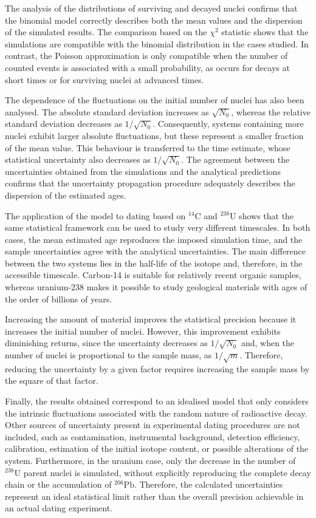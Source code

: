 \documentclass[12pt,a4paper]{article}
\begin{document}
The analysis of the distributions of surviving and decayed nuclei confirms that the binomial model correctly describes both the mean values and the dispersion of the simulated results. The comparison based on the $\chi^2$ statistic shows that the simulations are compatible with the binomial distribution in the cases studied. In contrast, the Poisson approximation is only compatible when the number of counted events is associated with a small probability, as occurs for decays at short times or for surviving nuclei at advanced times.

The dependence of the fluctuations on the initial number of nuclei has also been analysed. The absolute standard deviation increases as $\sqrt{N_0}$, whereas the relative standard deviation decreases as $1/\sqrt{N_0}$. Consequently, systems containing more nuclei exhibit larger absolute fluctuations, but these represent a smaller fraction of the mean value. This behaviour is transferred to the time estimate, whose statistical uncertainty also decreases as $1/\sqrt{N_0}$. The agreement between the uncertainties obtained from the simulations and the analytical predictions confirms that the uncertainty propagation procedure adequately describes the dispersion of the estimated ages.

The application of the model to dating based on $^{14}\text{C}$ and $^{238}\text{U}$ shows that the same statistical framework can be used to study very different timescales. In both cases, the mean estimated age reproduces the imposed simulation time, and the sample uncertainties agree with the analytical uncertainties. The main difference between the two systems lies in the half-life of the isotope and, therefore, in the accessible timescale. Carbon-14 is suitable for relatively recent organic samples, whereas uranium-238 makes it possible to study geological materials with ages of the order of billions of years.

Increasing the amount of material improves the statistical precision because it increases the initial number of nuclei. However, this improvement exhibits diminishing returns, since the uncertainty decreases as $1/\sqrt{N_0}$ and, when the number of nuclei is proportional to the sample mass, as $1/\sqrt{m}$. Therefore, reducing the uncertainty by a given factor requires increasing the sample mass by the square of that factor.

Finally, the results obtained correspond to an idealised model that only considers the intrinsic fluctuations associated with the random nature of radioactive decay. Other sources of uncertainty present in experimental dating procedures are not included, such as contamination, instrumental background, detection efficiency, calibration, estimation of the initial isotope content, or possible alterations of the system. Furthermore, in the uranium case, only the decrease in the number of $^{238}\text{U}$ parent nuclei is simulated, without explicitly reproducing the complete decay chain or the accumulation of $^{206}\text{Pb}$. Therefore, the calculated uncertainties represent an ideal statistical limit rather than the overall precision achievable in an actual dating experiment.
\end{document}
